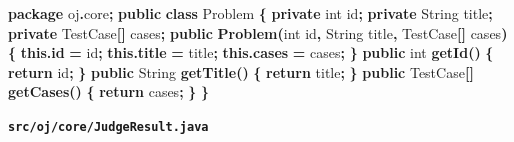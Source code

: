 \documentclass[
  11pt,
]{ctexart}
\newenvironment{Shaded}{\begin{snugshade}}{\end{snugshade}}
\newcommand{\BuiltInTok}[1]{#1}
\newcommand{\ControlFlowTok}[1]{\textcolor[rgb]{0.13,0.29,0.53}{\textbf{#1}}}
\newcommand{\DataTypeTok}[1]{\textcolor[rgb]{0.13,0.29,0.53}{#1}}
\newcommand{\FunctionTok}[1]{\textcolor[rgb]{0.13,0.29,0.53}{\textbf{#1}}}
\newcommand{\ImportTok}[1]{#1}
\newcommand{\KeywordTok}[1]{\textcolor[rgb]{0.13,0.29,0.53}{\textbf{#1}}}
\newcommand{\NormalTok}[1]{#1}
\newcommand{\OperatorTok}[1]{\textcolor[rgb]{0.81,0.36,0.00}{\textbf{#1}}}
\begin{document}
\begin{Shaded}
\begin{Highlighting}[]
\KeywordTok{package}\ImportTok{ oj}\OperatorTok{.}\ImportTok{core}\OperatorTok{;}
\KeywordTok{public} \KeywordTok{class}\NormalTok{ Problem }\OperatorTok{\{}
    \KeywordTok{private} \DataTypeTok{int}\NormalTok{ id}\OperatorTok{;} \KeywordTok{private} \BuiltInTok{String}\NormalTok{ title}\OperatorTok{;} \KeywordTok{private}\NormalTok{ TestCase}\OperatorTok{[]}\NormalTok{ cases}\OperatorTok{;}
    \KeywordTok{public} \FunctionTok{Problem}\OperatorTok{(}\DataTypeTok{int}\NormalTok{ id}\OperatorTok{,} \BuiltInTok{String}\NormalTok{ title}\OperatorTok{,}\NormalTok{ TestCase}\OperatorTok{[]}\NormalTok{ cases}\OperatorTok{)} \OperatorTok{\{} \KeywordTok{this}\OperatorTok{.}\FunctionTok{id} \OperatorTok{=}\NormalTok{ id}\OperatorTok{;} \KeywordTok{this}\OperatorTok{.}\FunctionTok{title} \OperatorTok{=}\NormalTok{ title}\OperatorTok{;} \KeywordTok{this}\OperatorTok{.}\FunctionTok{cases} \OperatorTok{=}\NormalTok{ cases}\OperatorTok{;} \OperatorTok{\}}
    \KeywordTok{public} \DataTypeTok{int} \FunctionTok{getId}\OperatorTok{()}           \OperatorTok{\{} \ControlFlowTok{return}\NormalTok{ id}\OperatorTok{;} \OperatorTok{\}}
    \KeywordTok{public} \BuiltInTok{String} \FunctionTok{getTitle}\OperatorTok{()}     \OperatorTok{\{} \ControlFlowTok{return}\NormalTok{ title}\OperatorTok{;} \OperatorTok{\}}
    \KeywordTok{public}\NormalTok{ TestCase}\OperatorTok{[]} \FunctionTok{getCases}\OperatorTok{()} \OperatorTok{\{} \ControlFlowTok{return}\NormalTok{ cases}\OperatorTok{;} \OperatorTok{\}}
\OperatorTok{\}}
\end{Highlighting}
\end{Shaded}

\textbf{\texttt{src/oj/core/JudgeResult.java}}
\end{document}
